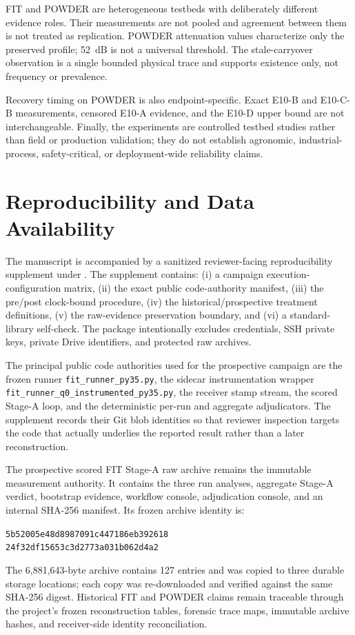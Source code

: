\documentclass[journal]{IEEEtran}
\begin{document}
FIT and POWDER are heterogeneous testbeds with deliberately different evidence roles. Their measurements are not pooled and agreement between them is not treated as replication. POWDER attenuation values characterize only the preserved profile; 52~dB is not a universal threshold. The stale-carryover observation is a single bounded physical trace and supports existence only, not frequency or prevalence.

Recovery timing on POWDER is also endpoint-specific. Exact E10-B and E10-C-B measurements, censored E10-A evidence, and the E10-D upper bound are not interchangeable. Finally, the experiments are controlled testbed studies rather than field or production validation; they do not establish agronomic, industrial-process, safety-critical, or deployment-wide reliability claims.

\section{Reproducibility and Data Availability}
\label{sec:repro}

The manuscript is accompanied by a sanitized reviewer-facing reproducibility supplement under
.
The supplement contains: (i) a campaign execution-configuration matrix, (ii) the exact public code-authority manifest, (iii) the pre/post clock-bound procedure, (iv) the historical/prospective treatment definitions, (v) the raw-evidence preservation boundary, and (vi) a standard-library self-check. The package intentionally excludes credentials, SSH private keys, private Drive identifiers, and protected raw archives.

The principal public code authorities used for the prospective campaign are the frozen runner \texttt{fit\_runner\_py35.py}, the sidecar instrumentation wrapper \texttt{fit\_runner\_q0\_instrumented\_py35.py}, the receiver stamp stream, the scored Stage-A loop, and the deterministic per-run and aggregate adjudicators. The supplement records their Git blob identities so that reviewer inspection targets the code that actually underlies the reported result rather than a later reconstruction.

The prospective scored FIT Stage-A raw archive remains the immutable measurement authority. It contains the three run analyses, aggregate Stage-A verdict, bootstrap evidence, workflow console, adjudication console, and an internal SHA-256 manifest. Its frozen archive identity is:
\begin{center}
\small\texttt{5b52005e48d8987091c447186eb392618}\\
\texttt{24f32df15653c3d2773a031b062d4a2}
\end{center}
The 6,881,643-byte archive contains 127 entries and was copied to three durable storage locations; each copy was re-downloaded and verified against the same SHA-256 digest. Historical FIT and POWDER claims remain traceable through the project's frozen reconstruction tables, forensic trace maps, immutable archive hashes, and receiver-side identity reconciliation.
\end{document}
